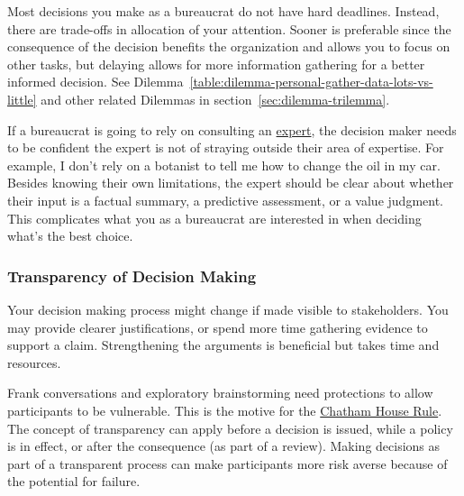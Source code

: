 Most decisions you make as a bureaucrat do not have hard deadlines. Instead, there are trade-offs in allocation of your attention. Sooner is preferable since the consequence of the decision benefits the organization and allows you to focus on other tasks, but delaying allows for more information gathering for a better informed decision. See 
Dilemma~\ref{table:dilemma-personal-gather-data-lots-vs-little}
and other related Dilemmas in section~\ref{sec:dilemma-trilemma}.


If a bureaucrat is going to rely on consulting an
\hyperref[sec:expertise]{expert},
the decision maker needs to be confident the expert is not of straying outside their area of expertise. For example, I don't rely on a botanist  to tell me how to change the oil in my car. 
Besides knowing their own limitations, the expert should be clear about whether their input is a factual summary, a predictive assessment, or a value judgment. This complicates what you as a bureaucrat are interested in when deciding what's the best choice.


\subsubsection{Transparency of Decision Making\label{sec:transparency-of-decisions}}

Your decision making process might change if made visible to stakeholders. You may provide clearer justifications, or spend more time gathering evidence to support a claim. Strengthening the arguments is beneficial but takes time and resources. 

Frank conversations and exploratory brainstorming need protections to allow participants to be vulnerable. 
This is the motive for the \href{https://en.wikipedia.org/wiki/Chatham_House_Rule}{Chatham House Rule}. 
The concept of transparency can apply before a decision is issued, while a policy is in effect, or after the consequence (as part of a review). 
Making decisions as part of a transparent process can make participants more risk averse because of the potential for failure.

